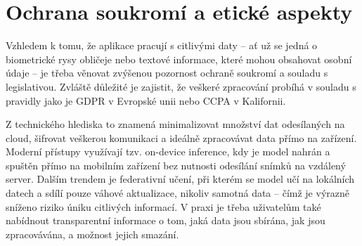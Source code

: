 \documentclass[FM,BP,CZ]{tulthesis}
\begin{document}
\section{Ochrana soukromí a etické aspekty}
Vzhledem k tomu, že aplikace pracují s citlivými daty – ať už se jedná o biometrické rysy obličeje nebo textové informace, které mohou obsahovat osobní údaje – je třeba věnovat zvýšenou pozornost ochraně soukromí a souladu s legislativou. Zvláště důležité je zajistit, že veškeré zpracování probíhá v souladu s pravidly jako je GDPR v Evropské unii \cite{gdpr2016} nebo CCPA v Kalifornii.

Z technického hlediska to znamená minimalizovat množství dat odesílaných na cloud, šifrovat veškerou komunikaci a ideálně zpracovávat data přímo na zařízení. Moderní přístupy využívají tzv. on-device inference, kdy je model nahrán a spuštěn přímo na mobilním zařízení bez nutnosti odesílání snímků na vzdálený server. Dalším trendem je federativní učení, při kterém se model učí na lokálních datech a sdílí pouze váhové aktualizace, nikoliv samotná data – čímž je výrazně sníženo riziko úniku citlivých informací. V praxi je třeba uživatelům také nabídnout transparentní informace o tom, jaká data jsou sbírána, jak jsou zpracovávána, a možnost jejich smazání.
\newpage
\end{document}
